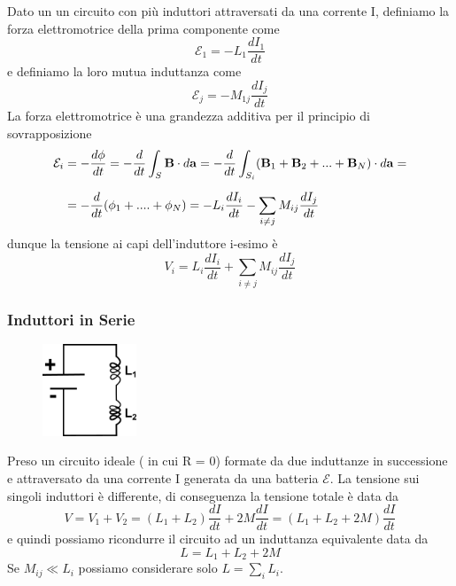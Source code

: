 Dato un un circuito con pi\`u induttori attraversati da una corrente I, definiamo la forza elettromotrice della prima componente come 
\begin{equation*}
	\mathcal{E}_1 = - L_1 \frac{dI_1}{dt}
\end{equation*}
e definiamo la loro mutua induttanza come 
\begin{equation*}
	\mathcal{E}_j = -M_{1j} \frac{d I_j}{dt} 
\end{equation*}
La forza elettromotrice \`e una grandezza additiva per il principio di sovrapposizione
\begin{align}
	\mathcal{E}_i &= - \frac{d\phi}{dt} = - \frac{d}{dt} \int_{S} \bold{B} \cdot d\bold{a} = - \frac{d}{dt} \int_{S_i} (\bold{B}_{1} + \bold{B}_{2} + ...+ \bold{B}_{N}) \cdot d \bold{a} = \notag \\ \rule{0pt}{20pt} 
	& = - \frac{d}{dt}(\phi_1 + ....+ \phi_N) = -L_{i} \frac{dI_i}{dt} - \sum_{i \neq j}M_{ij}\frac{dI_j}{dt}
\end{align}
\newpage 
dunque la tensione ai capi dell'induttore i-esimo \`e 
\begin{equation}
	V_i = L_i \frac{d I_i}{dt} + \sum_{i \neq j} M_{ij}\frac{dI_j}{dt}
\end{equation}

\subsubsection{Induttori in Serie}
	\begin{figure} %
    \centering
    \includegraphics[width=0.25\textwidth]{images/inductance_series} %
\end{figure}

Preso un circuito ideale ( in cui R = 0) formate da due induttanze in successione e attraversato da una corrente I generata da una batteria $\mathcal{E}$. La tensione sui singoli induttori \`e differente, di conseguenza la tensione totale \`e data da 
\begin{equation*}
	V = V_1 + V_2 = (L_1 + L_2) \frac{dI}{dt} + 2M \frac{dI}{dt} = (L_1 + L_2 + 2M) \frac{dI}{dt}
\end{equation*}
e quindi possiamo ricondurre il circuito ad un induttanza equivalente data da
\begin{equation}
	L = L_1 + L_2 + 2M
\end{equation}
Se $M_{ij} \ll L_i$ possiamo considerare solo $L = \sum_{i} L_i$.

